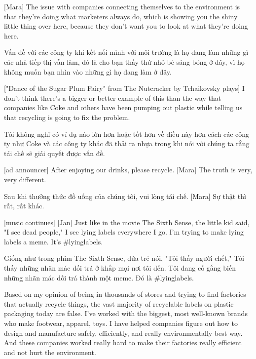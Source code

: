 \documentclass[a4paper]{article}
\begin{document}
	[Mara] The issue with companies connecting themselves to the environment is that they're doing what marketers always do, which is showing you the shiny little thing over here, because they don't want you to look at what they're doing here.
	
	\begin{vietnamese-v2}
		[Mara] Vấn đề với các công ty khi kết nối mình với môi trường là họ đang làm những gì các nhà tiếp thị vẫn làm, đó là cho bạn thấy thứ nhỏ bé sáng bóng ở đây, vì họ không muốn bạn nhìn vào những gì họ đang làm ở đây.
	\end{vietnamese-v2}
	
	["Dance of the Sugar Plum Fairy" from The Nutcracker by Tchaikovsky plays]
	I don't think there's a bigger or better example of this than the way that companies like Coke and others have been pumping out plastic while telling us that recycling is going to fix the problem.
	
	\begin{vietnamese-v2}
		Tôi không nghĩ có ví dụ nào lớn hơn hoặc tốt hơn về điều này hơn cách các công ty như Coke và các công ty khác đã thải ra nhựa trong khi nói với chúng ta rằng tái chế sẽ giải quyết được vấn đề.
	\end{vietnamese-v2}
	
	[ad announcer] After enjoying our drinks, please recycle.
	[Mara] The truth is very, very different.
	
	\begin{vietnamese-v2}
		 Sau khi thưởng thức đồ uống của chúng tôi, vui lòng tái chế.
		[Mara] Sự thật thì rất, rất khác.	
	\end{vietnamese-v2}
	
	[music continues]
	[Jan] Just like in the movie The Sixth Sense, the little kid said, "I see dead people,"
	I see lying labels everywhere I go.
	I'm trying to make lying labels a meme.
	It's \#lyinglabels.
	
	\begin{vietnamese-v2}
		 Giống như trong phim The Sixth Sense, đứa trẻ nói, "Tôi thấy người chết,"
		Tôi thấy những nhãn mác dối trá ở khắp mọi nơi tôi đến.
		Tôi đang cố gắng biến những nhãn mác dối trá thành một meme.
		Đó là \#lyinglabels.
	\end{vietnamese-v2}
	
	Based on my opinion of being in thousands of stores and trying to find factories that actually recycle things, the vast majority of recyclable labels on plastic packaging today are false.
	I've worked with the biggest, most well-known brands who make footwear, apparel, toys.
	I have helped companies figure out how to design and manufacture safely, efficiently, and really environmentally best way.
	And these companies worked really hard to make their factories really efficient and not hurt the environment.
	
\end{document}
